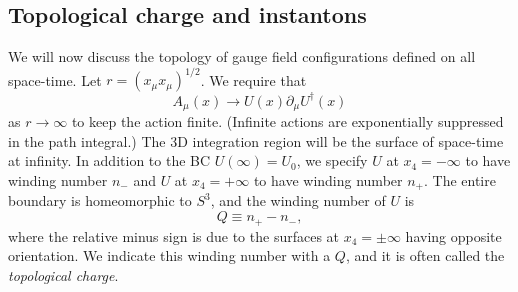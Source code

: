 \subsection{Topological charge and instantons}

We will now discuss the topology of gauge field
configurations defined on all space-time. Let $r=(x_\mu x_\mu)^{1/2}$.
We require that
\begin{equation}
  A_\mu(x)\to U(x)\partial_\mu U^\dagger(x)
\end{equation}
as $r\to\infty$ to keep the action finite. (Infinite actions are
exponentially suppressed in the path integral.) The 3D integration
region will be the surface of space-time at infinity.
In addition to the BC $U(\infty)=U_0$, we specify $U$ at $x_4=-\infty$
to have winding number $n_-$ and $U$ at $x_4=+\infty$ to have
winding number $n_+$. The entire boundary is homeomorphic to
$S^3$, and the winding number of $U$ is
\begin{equation}
  Q\equiv n_+-n_-, 
\end{equation}
where the relative minus sign is due to the surfaces at $x_4=\pm\infty$
having opposite orientation. We indicate this winding number with a
$Q$, and it is often called the {\it topological charge}.

